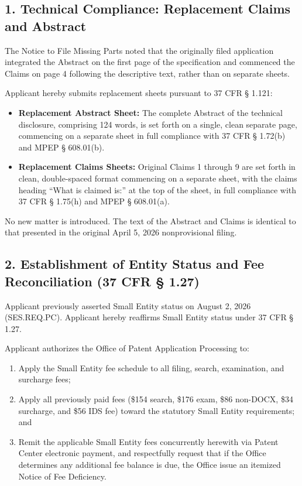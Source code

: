 \documentclass[11pt,letterpaper]{article}
\begin{document}
\subsection*{1. Technical Compliance: Replacement Claims and Abstract}

The Notice to File Missing Parts noted that the originally filed application integrated the Abstract on the first page of the specification and commenced the Claims on page 4 following the descriptive text, rather than on separate sheets.

Applicant hereby submits replacement sheets pursuant to 37 CFR \S{} 1.121:
\begin{itemize}[leftmargin=2em, itemsep=2pt, parsep=0pt]
    \item \textbf{Replacement Abstract Sheet:} The complete Abstract of the technical disclosure, comprising 124 words, is set forth on a single, clean separate page, commencing on a separate sheet in full compliance with 37 CFR \S{} 1.72(b) and MPEP \S{} 608.01(b).
    \item \textbf{Replacement Claims Sheets:} Original Claims 1 through 9 are set forth in clean, double-spaced format commencing on a separate sheet, with the claims heading ``What is claimed is:'' at the top of the sheet, in full compliance with 37 CFR \S{} 1.75(h) and MPEP \S{} 608.01(a).
\end{itemize}

No new matter is introduced. The text of the Abstract and Claims is identical to that presented in the original April 5, 2026 nonprovisional filing.

\subsection*{2. Establishment of Entity Status and Fee Reconciliation (37 CFR \S{} 1.27)}

Applicant previously asserted Small Entity status on August 2, 2026 (SES.REQ.PC). Applicant hereby reaffirms Small Entity status under 37 CFR \S{} 1.27. 

Applicant authorizes the Office of Patent Application Processing to:
\begin{enumerate}[label=(\alph*), leftmargin=2em, itemsep=2pt, parsep=0pt]
    \item Apply the Small Entity fee schedule to all filing, search, examination, and surcharge fees;
    \item Apply all previously paid fees (\$154 search, \$176 exam, \$86 non-DOCX, \$34 surcharge, and \$56 IDS fee) toward the statutory Small Entity requirements; and
    \item Remit the applicable Small Entity fees concurrently herewith via Patent Center electronic payment, and respectfully request that if the Office determines any additional fee balance is due, the Office issue an itemized Notice of Fee Deficiency.
\end{enumerate}
\end{document}
